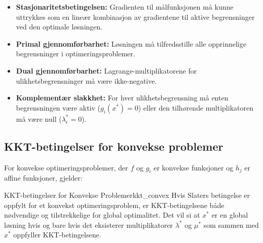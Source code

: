 \begin{itemize}
	\item \textbf{Stasjonaritetsbetingelsen:} Gradienten til målfunksjonen må kunne uttrykkes som en lineær kombinasjon av gradientene til aktive begrensninger ved den optimale løsningen.

	\item \textbf{Primal gjennomførbarhet:} Løsningen må tilfredsstille alle opprinnelige begrensninger i optimeringsproblemer.

	\item \textbf{Dual gjennomførbarhet:} Lagrange-multiplikatorene for ulikhetsbegrensninger må være ikke-negative.

	\item \textbf{Komplementær slakkhet:} For hver ulikhetsbegrensning må enten begrensningen være aktiv ($g_i(x^*) = 0$) eller den tilhørende multiplikatoren må være null ($\lambda_i^* = 0$).
\end{itemize}

\subsection{KKT-betingelser for konvekse problemer}

For konvekse optimeringsproblemer, der $f$ og $g_i$ er konvekse funksjoner og $h_j$ er affine funksjoner, gjelder:

\begin{theorem}{KKT-betingelser for Konvekse Problemer}{kkt_convex}
	Hvis Slaters betingelse er oppfylt for et konvekst optimeringsproblem, er KKT-betingelsene både nødvendige og tilstrekkelige for global optimalitet.
	Det vil si at $x^*$ er en global løsning hvis og bare hvis det eksisterer multiplikatorer $\lambda^*$ og $\mu^*$ som sammen med $x^*$ oppfyller KKT-betingelsene.
\end{theorem}

